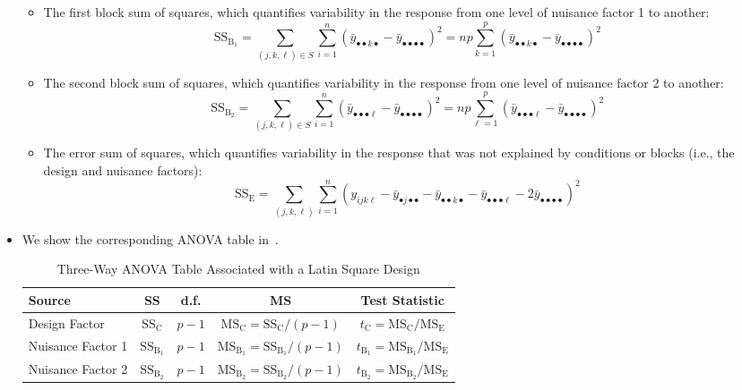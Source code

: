 \begin{itemize}
\begin{itemize}
              \item The first block sum of squares, which quantifies variability in the response from one level of nuisance factor 1 to another:
                    \[ \text{SS}_{\text{B}_1}=\sum_{(j,k,\ell)\in S}\sum_{i=1}^{n} (\bar{y}_{\bullet\bullet k\bullet}-\bar{y}_{\bullet\bullet\bullet\bullet})^2=np \sum_{k=1}^{p} (\bar{y}_{\bullet\bullet k\bullet}-\bar{y}_{\bullet\bullet\bullet\bullet})^2  \]
              \item The second block sum of squares, which quantifies variability in the response from one level of nuisance factor 2 to another:
                    \[ \text{SS}_{\text{B}_2}=\sum_{(j,k,\ell)\in S}\sum_{i=1}^{n} (\bar{y}_{\bullet\bullet\bullet\ell}-\bar{y}_{\bullet\bullet\bullet\bullet})^2=np \sum_{\ell=1}^{p} (\bar{y}_{\bullet\bullet\bullet\ell}-\bar{y}_{\bullet\bullet\bullet\bullet})^2  \]
              \item The error sum of squares, which quantifies variability in the response that was not explained by conditions or blocks (i.e., the design and nuisance factors):
                    \[ \text{SS}_\text{E}=\sum_{(j,k,\ell)}\sum_{i=1}^{n} (y_{ijk\ell}-\bar{y}_{\bullet j\bullet\bullet}-\bar{y}_{\bullet\bullet k\bullet}-\bar{y}_{\bullet\bullet\bullet\ell}-2\bar{y}_{\bullet\bullet\bullet\bullet})^2 \]
          \end{itemize}
    \item We show the corresponding ANOVA table in~.
          \begin{table}[!htbp]
              \centering
              \caption{Three-Way ANOVA Table Associated with a Latin Square Design}\label{three_way_anova_LS}
              \begin{NiceTabular}{|l|c|c|c|c|}
                  \toprule
                  Source    & SS                     & d.f.        & MS                                                                   & Test Statistic                                           \\
                  \midrule
                  Design Factor & $ \text{SS}_\text{C} $ & $ p-1 $     & $ \text{MS}_\text{C}=\text{SS}_\text{C}/(p-1) $     & $ t_\text{C}=\text{MS}_\text{C}/\text{MS}_\text{E} $ \\
                  Nuisance Factor 1     & $ \text{SS}_{\text{B}_1} $ & $ p-1 $     & $ \text{MS}_{\text{B}_1}=\text{SS}_{\text{B}_1}/(p-1) $     & $ t_{\text{B}_1}=\text{MS}_{\text{B}_1}/\text{MS}_\text{E} $ \\
                  Nuisance Factor 2     & $ \text{SS}_{\text{B}_2} $ & $ p-1 $     & $ \text{MS}_{\text{B}_2}=\text{SS}_{\text{B}_2}/(p-1) $     & $ t_{\text{B}_2}=\text{MS}_{\text{B}_2}/\text{MS}_\text{E} $ \\

\end{NiceTabular}
\end{table}
\end{itemize}
